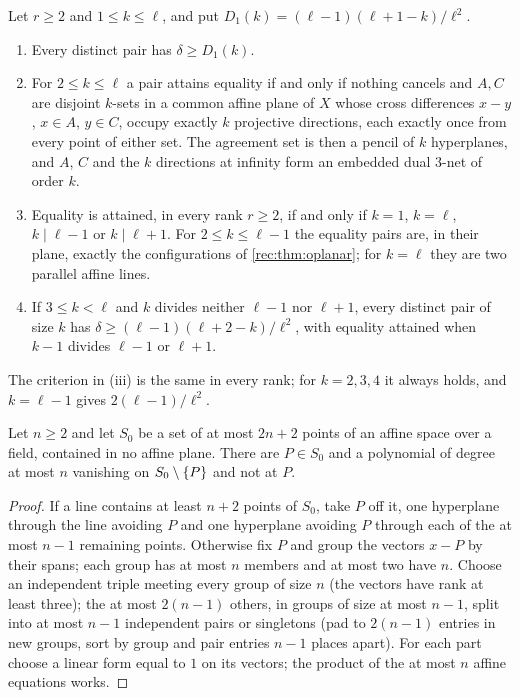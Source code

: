 \begin{theorem}\label{rec:thm:osmall}
Let $r\ge2$ and $1\le k\le\ell$, and put $D_1(k)=(\ell-1)(\ell+1-k)/\ell^2$.
\begin{enumerate}
\item Every distinct pair has $\delta\ge D_1(k)$.
\item For $2\le k\le\ell$ a pair attains equality if and only if nothing cancels and $A,C$ are disjoint $k$-sets in
a common affine plane of $X$ whose cross differences $x-y$, $x\in A$, $y\in C$, occupy exactly $k$ projective
directions, each exactly once from every point of either set. The agreement set is then a pencil of $k$
hyperplanes, and $A$, $C$ and the $k$ directions at infinity form an embedded dual $3$-net of order $k$.
\item Equality is attained, in every rank $r\ge2$, if and only if $k=1$, $k=\ell$, $k\mid\ell-1$ or $k\mid\ell+1$. For
$2\le k\le\ell-1$ the equality pairs are, in their plane, exactly the configurations of \cref{rec:thm:oplanar}; for
$k=\ell$ they are two parallel affine lines.
\item If $3\le k<\ell$ and $k$ divides neither $\ell-1$ nor $\ell+1$, every distinct pair of size $k$ has
$\delta\ge(\ell-1)(\ell+2-k)/\ell^2$, with equality attained when $k-1$ divides $\ell-1$ or $\ell+1$.
\end{enumerate}
\end{theorem}

The criterion in (iii) is the same in every rank; for $k=2,3,4$ it always holds, and $k=\ell-1$ gives
$2(\ell-1)/\ell^2$.

\begin{lemma}\label{rec:lem:osep}
Let $n\ge2$ and let $S_0$ be a set of at most $2n+2$ points of an affine space over a field, contained in no affine
plane. There are $P\in S_0$ and a polynomial of degree at most $n$ vanishing on $S_0\setminus\{P\}$ and not at $P$.
\end{lemma}

\begin{proof}
If a line contains at least $n+2$ points of $S_0$, take $P$ off it, one hyperplane through the line avoiding $P$
and one hyperplane avoiding $P$ through each of the at most $n-1$ remaining points. Otherwise fix $P$ and
group the vectors $x-P$ by their spans; each group has at most $n$ members and at most two have $n$. Choose
an independent triple meeting every group of size $n$ (the vectors have rank at least three); the at most
$2(n-1)$ others, in groups of size at most $n-1$, split into at most $n-1$ independent pairs or singletons
(pad to $2(n-1)$ entries in new groups, sort by group and pair entries $n-1$ places apart). For each part
choose a linear form equal to $1$ on its vectors; the product of the at most $n$ affine equations works.
\end{proof}

